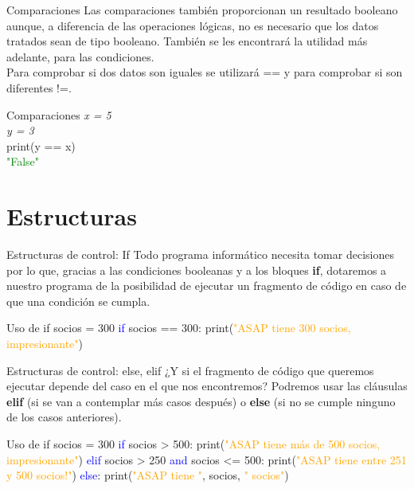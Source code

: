 \documentclass{beamer}
\begin{document}
\begin{frame}{Comparaciones}
Las comparaciones también proporcionan un resultado booleano aunque, a diferencia de las operaciones lógicas, no es necesario que los datos tratados sean de tipo booleano. También se les encontrará la utilidad más adelante, para las condiciones.\\
Para comprobar si dos datos son iguales se utilizará == y para comprobar si son diferentes !=.
\begin{Programexample} {Comparaciones}
\centering
\textit{x = 5}\\
\textit{y = 3}\\
print(y == x)\\
\textcolor{green}{"False"}
\end{Programexample}
\end{frame}

\section{Estructuras}

\begin{frame}{Estructuras de control: If}
Todo programa informático necesita tomar decisiones por lo que, gracias a las condiciones booleanas y a los bloques \textbf{if}, dotaremos a nuestro programa de la posibilidad de ejecutar un fragmento de código en caso de que una condición se cumpla.
\begin{Programexample} {Uso de if}
socios = 300 \newline
\textcolor{blue}{if} socios == 300:\newline
\hspace*{1cm} print(\textcolor{orange}{"ASAP tiene 300 socios, impresionante"})
\end{Programexample}
\end{frame}

\begin{frame}{Estructuras de control: else, elif}
¿Y si el fragmento de código que queremos ejecutar depende del caso en el que nos encontremos? Podremos usar las cláusulas \textbf{elif} (si se van a contemplar más casos después) o \textbf{else} (si no se cumple ninguno de los casos anteriores).
\begin{Programexample} {Uso de if}
socios = 300 \newline
\textcolor{blue}{if} socios > 500:\newline
\hspace*{1cm} print(\textcolor{orange}{"ASAP tiene más de 500 socios, impresionante"})\newline
\textcolor{blue}{elif} socios > 250 \textcolor{blue}{and} socios <= 500:\newline
\hspace*{1cm} print(\textcolor{orange}{"ASAP tiene entre 251 y 500 socios!"})\newline
\textcolor{blue}{else}:\newline
\hspace*{1cm} print(\textcolor{orange}{"ASAP tiene "}, socios,  \textcolor{orange}{" socios"})
\end{Programexample}
\end{frame}
\end{document}
